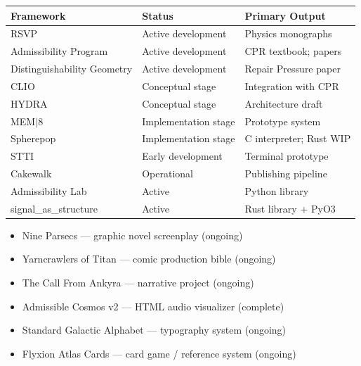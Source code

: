 \documentclass[11pt, oneside]{book}
\theoremstyle{definition}
\theoremstyle{remark}
\begin{document}
\begin{summarybox}
\begin{center}
\begin{tabular}{lll}
\toprule
Framework & Status & Primary Output \\
\midrule
RSVP & Active development & Physics monographs \\
Admissibility Program & Active development & CPR textbook; papers \\
Distinguishability Geometry & Active development & Repair Pressure paper \\
CLIO & Conceptual stage & Integration with CPR \\
HYDRA & Conceptual stage & Architecture draft \\
MEM$|$8 & Implementation stage & Prototype system \\
Spherepop & Implementation stage & C interpreter; Rust WIP \\
STTI & Early development & Terminal prototype \\
Cakewalk & Operational & Publishing pipeline \\
Admissibility Lab & Active & Python library \\
signal\_as\_structure & Active & Rust library + PyO3 \\
\bottomrule
\end{tabular}
\end{center}
\end{summarybox}

\begin{summarybox}
\begin{itemize}[leftmargin=1.5em]
\item Nine Parsecs — graphic novel screenplay (ongoing)
\item Yarncrawlers of Titan — comic production bible (ongoing)
\item The Call From Ankyra — narrative project (ongoing)
\item Admissible Cosmos v2 — HTML audio visualizer (complete)
\item Standard Galactic Alphabet — typography system (ongoing)
\item Flyxion Atlas Cards — card game / reference system (ongoing)
\end{itemize}
\end{summarybox}

\appendix
\end{document}
